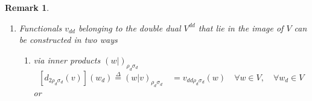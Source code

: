 \documentclass[aps,preprint]{revtex4}
\newtheorem{remark}[theorem]{Remark}
\begin{document}
\begin{remark}
\begin{enumerate}
\begin{enumerate}
\item The identity on the imbedding $\mathfrak{i}_{eV^{d}V}\left(
V^{d}\right) $ of $V^{d}$ in $V^{dd}$ generated by the basis $\left( 
\boldsymbol{e}\right) $ is given by 
\begin{equation}
I_{\mathfrak{i}_{eV^{d}V}\left( V^{d}\right) }=\sum_{1\leq j\leq r}\left(
\left. \overset{}{\mathfrak{b}_{e\rho _{d}\sigma _{d}}\left( e_{j}\right) }%
\right\vert \cdot \right) _{\rho _{d}\sigma _{d}}\left( \left. \overset{}{%
\mathfrak{\cdot }}\right\vert e_{j}\right) _{\rho _{d}\sigma _{d}}=\left[
\sum_{1\leq j\leq r}b_{e}\left( e_{j}\right) d_{2}\left( e_{j}\right) \right]
\left( \cdot \right) :V^{d}\rightarrow V^{d},
\end{equation}%
which is independent of $\left\{ \rho _{d},\sigma _{d}\right\} $

\item Recall that dualizing maps $d_{1\rho _{d}\sigma _{d}}$ are defined by 
\begin{equation}
\left[ \overset{}{d_{1\rho _{d}\sigma _{d}}\left( v\right) }\right] \left(
\cdot \right) \overset{\Delta }{=}\left( \left. \overset{}{v}\right\vert
\cdot \right) _{\rho _{d}\sigma _{d}}=v_{d\rho _{d}\sigma _{d}}\left( \cdot
\right) ,\quad v_{d\rho _{d}\sigma _{d}}\in V^{d}.
\end{equation}%
and

\item $V^{d}$ is generated by the sets of vectors 
\begin{equation}
V^{d}=\left\{ \overset{}{w_{d}\in V^{d}}\right\} =\left\{ \left. \left(
\left. \overset{}{v}\right\vert \cdot \right) _{\rho _{d}\sigma _{d}}=\left[
d_{1\rho _{d}\sigma _{d}}\left( v\right) \right] \left( \cdot \right)
\right\vert \quad v\in V,\quad \forall \rho _{d},\sigma _{d}\in V^{d}\right\}
\end{equation}%
that are closed under vector space operations.
\end{enumerate}

\item Functionals $v_{dd}$ belonging to the double dual $V^{dd}$ that lie in
the image of $V$ can be constructed in two ways

\begin{enumerate}
\item via inner products $\left( \left. w\right\vert \right) _{\rho
_{d}\sigma _{d}}$ 
\begin{equation}
\left[ \overset{}{d_{2\rho _{d}\sigma _{d}}\left( v\right) }\right] \left(
w_{d}\right) \overset{\Delta }{=}\left( \left. \overset{}{w}\right\vert
v\right) _{\rho _{d}\sigma _{d}}\quad =v_{dd\rho _{d}\sigma _{d}}\left(
w\right) \quad \forall w\in V,\quad \forall w_{d}\in V
\end{equation}%
or


\end{enumerate}
\end{enumerate}
\end{remark}
\end{document}
